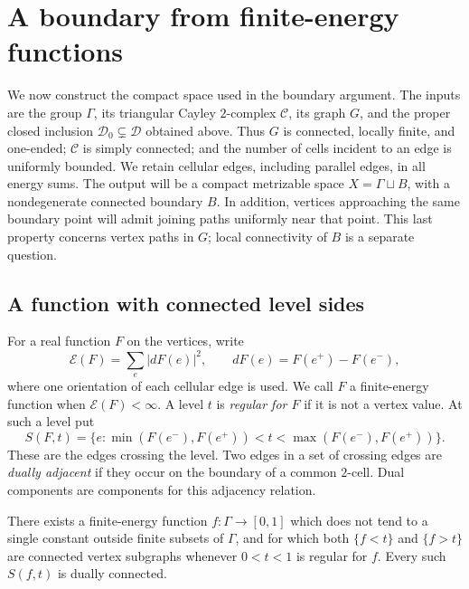 \section{A boundary from finite-energy functions}
\label{sec:compactification}

We now construct the compact space used in the boundary argument.
The inputs are the group $\Gamma$, its triangular Cayley $2$-complex
$\mathcal C$, its graph $G$, and the proper closed inclusion
$\mathcal D_0\subsetneq\mathcal D$ obtained above.  Thus $G$ is connected,
locally finite, and one-ended; $\mathcal C$ is simply connected; and the
number of cells incident to an edge is uniformly bounded.  We retain
cellular edges, including parallel edges, in all energy sums.
The output will be a compact metrizable space $X=\Gamma\sqcup B$, with a
nondegenerate connected boundary $B$.  In addition, vertices approaching
the same boundary point will admit joining paths uniformly near that
point.  This last property concerns vertex paths in $G$; local
connectivity of $B$ is a separate question.

\subsection{A function with connected level sides}

For a real function $F$ on the vertices, write
\[
 \mathcal E(F)=\sum_e |dF(e)|^2,
 \qquad dF(e)=F(e^+)-F(e^-),
\]
where one orientation of each cellular edge is used.  We call $F$ a
finite-energy function when $\mathcal E(F)<\infty$.  A level $t$ is
\emph{regular for $F$} if it is not a vertex value.  At such a level put
\[
 S(F,t)=\{e:\min(F(e^-),F(e^+))<t<
                       \max(F(e^-),F(e^+))\}.
\]
These are the edges crossing the level.  Two edges in a set of crossing
edges are \emph{dually adjacent} if they occur on the boundary of a common
$2$-cell.  Dual components are components for this adjacency relation.

\begin{lemma}\label{compact:potential}
There exists a finite-energy function $f:\Gamma\to[0,1]$ which does not
tend to a single constant outside finite subsets of $\Gamma$, and for
which both $\{f<t\}$ and $\{f>t\}$ are connected vertex subgraphs whenever
$0<t<1$ is regular for $f$.  Every such $S(f,t)$ is dually connected.
\end{lemma}


